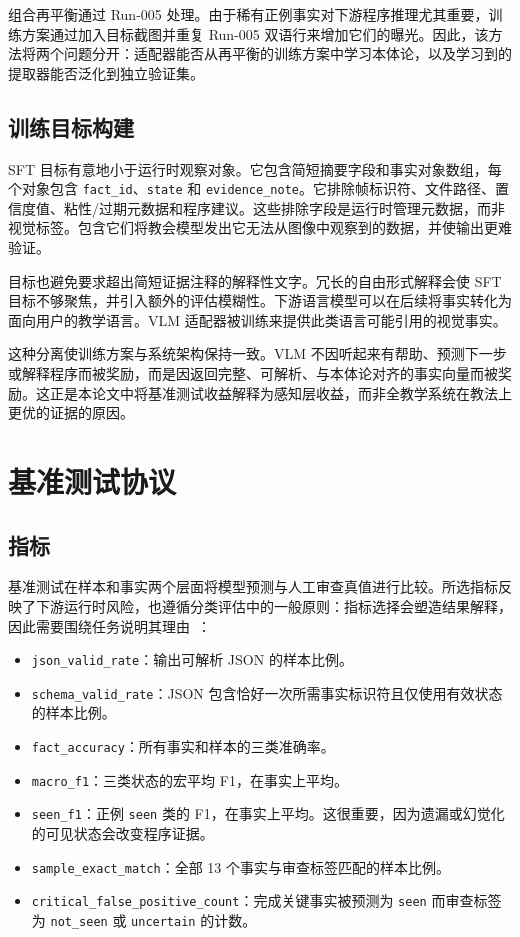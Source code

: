组合再平衡通过 Run-005 处理。由于稀有正例事实对下游程序推理尤其重要，训练方案通过加入目标截图并重复 Run-005 双语行来增加它们的曝光。因此，该方法将两个问题分开：适配器能否从再平衡的训练方案中学习本体论，以及学习到的提取器能否泛化到独立验证集。

\subsection{训练目标构建}

SFT 目标有意地小于运行时观察对象。它包含简短摘要字段和事实对象数组，每个对象包含 \texttt{fact\_id}、\texttt{state} 和 \texttt{evidence\_note}。它排除帧标识符、文件路径、置信度值、粘性/过期元数据和程序建议。这些排除字段是运行时管理元数据，而非视觉标签。包含它们将教会模型发出它无法从图像中观察到的数据，并使输出更难验证。

目标也避免要求超出简短证据注释的解释性文字。冗长的自由形式解释会使 SFT 目标不够聚焦，并引入额外的评估模糊性。下游语言模型可以在后续将事实转化为面向用户的教学语言。VLM 适配器被训练来提供此类语言可能引用的视觉事实。

这种分离使训练方案与系统架构保持一致。VLM 不因听起来有帮助、预测下一步或解释程序而被奖励，而是因返回完整、可解析、与本体论对齐的事实向量而被奖励。这正是本论文中将基准测试收益解释为感知层收益，而非全教学系统在教法上更优的证据的原因。

\section{基准测试协议}\label{sec:method-benchmark}

\subsection{指标}

基准测试在样本和事实两个层面将模型预测与人工审查真值进行比较。所选指标反映了下游运行时风险，也遵循分类评估中的一般原则：指标选择会塑造结果解释，因此需要围绕任务说明其理由~\citep{powers2011evaluation,opitz2024metrics}：

\begin{itemize}
\item \texttt{json\_valid\_rate}：输出可解析 JSON 的样本比例。
\item \texttt{schema\_valid\_rate}：JSON 包含恰好一次所需事实标识符且仅使用有效状态的样本比例。
\item \texttt{fact\_accuracy}：所有事实和样本的三类准确率。
\item \texttt{macro\_f1}：三类状态的宏平均 F1，在事实上平均。
\item \texttt{seen\_f1}：正例 \texttt{seen} 类的 F1，在事实上平均。这很重要，因为遗漏或幻觉化的可见状态会改变程序证据。
\item \texttt{sample\_exact\_match}：全部 13 个事实与审查标签匹配的样本比例。
\item \texttt{critical\_false\_positive\_count}：完成关键事实被预测为 \texttt{seen} 而审查标签为 \texttt{not\_seen} 或 \texttt{uncertain} 的计数。
\end{itemize}

